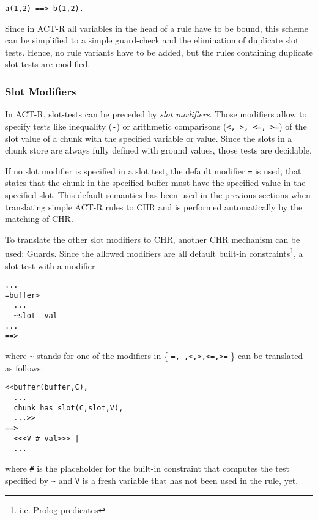 \begin{lstlisting}
a(1,2) ==> b(1,2).
\end{lstlisting}

Since in ACT-R all variables in the head of a rule have to be bound, this scheme can be simplified to a simple guard-check and the elimination of duplicate slot tests. Hence, no rule variants have to be added, but the rules containing duplicate slot tests are modified.

\subsubsection{Slot Modifiers}
\label{slot_modifiers}

In ACT-R, slot-tests can be preceded by \emph{slot modifiers}. Those modifiers allow to specify tests like inequality (\lstinline|-|) or arithmetic comparisons (\lstinline|<, >, <=, >=|) of the slot value of a chunk with the specified variable or value. Since the slots in a chunk store are always fully defined with ground values, those tests are decidable.

If no slot modifier is specified in a slot test, the default modifier \lstinline|=| is used, that states that the chunk in the specified buffer must have the specified value in the specified slot. This default semantics has been used in the previous sections when translating simple ACT-R rules to CHR and is performed automatically by the matching of CHR.

To translate the other slot modifiers to CHR, another CHR mechanism can be used: Guards. Since the allowed modifiers are all default built-in constraints\footnote{i.e. Prolog predicates}, a slot test with a modifier

\begin{lstlisting}
...
=buffer>
  ...
  ~slot  val
...
==>
\end{lstlisting}

where \lstinline|~| stands for one of the modifiers in \{ \lstinline|=,-,<,>,<=,>=| \} can be translated as follows:

\begin{lstlisting}
<<buffer(buffer,C),
  ...
  chunk_has_slot(C,slot,V),
  ...>>
==>
  <<<V # val>>> |
  ...
\end{lstlisting}

where \lstinline|#| is the placeholder for the built-in constraint that computes the test specified by \lstinline|~| and \lstinline|V| is a fresh variable that has not been used in the rule, yet.

